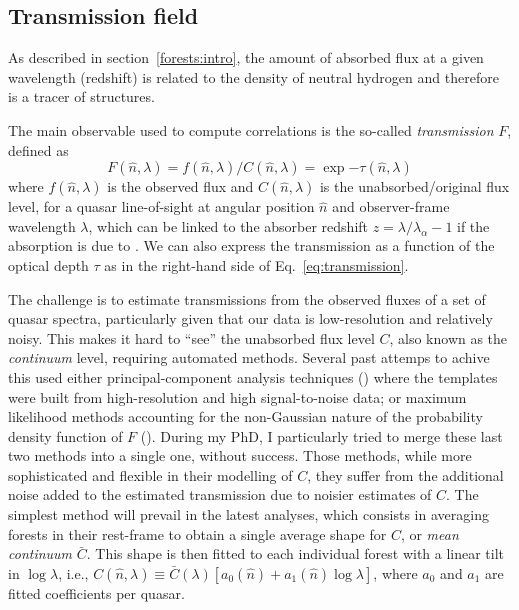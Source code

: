 \subsection{Transmission field}
\label{forests:bao:transmission}

As described in section~\ref{forests:intro}, the amount of absorbed 
flux at a given wavelength (redshift) is related to the density 
of neutral hydrogen and therefore is a tracer of structures.  

The main observable used to compute correlations is the so-called
\emph{transmission} $F$, defined as 
\begin{equation}
    F(\hat{n}, \lambda) = f(\hat{n}, \lambda)/C(\hat{n}, \lambda) = \exp{-\tau(\hat{n}, \lambda)}
    \label{eq:transmission}
\end{equation} 
where 
$f(\hat{n}, \lambda)$ is the observed flux and 
$C(\hat{n}, \lambda)$ is the unabsorbed/original flux level, 
for a quasar line-of-sight at angular position $\hat{n}$ 
and observer-frame wavelength $\lambda$, which can be linked to the
absorber redshift $z = \lambda/\lambda_\alpha - 1$ if the absorption is 
due to \lya. We can also express the transmission as a function of the 
optical depth $\tau$ as in the right-hand side of Eq.~\ref{eq:transmission}.

The challenge is to estimate transmissions from the observed fluxes of a set of quasar
spectra, particularly given that our data is low-resolution and relatively noisy.
This makes it hard to ``see'' the unabsorbed flux level $C$, also known as the 
\emph{continuum} level, requiring automated methods. Several past attemps to achive this 
used either principal-component analysis techniques 
(\cite{leeMeanfluxregulatedPrincipalComponent2012}) where the templates were built from 
high-resolution and high signal-to-noise data; or maximum likelihood methods accounting
for the non-Gaussian nature of the probability density function of $F$ 
(\cite{buscaBaryonAcousticOscillations2013}). 
During my PhD, I particularly tried to merge these 
last two methods into a single one, without success. 
Those methods, while more sophisticated and flexible in their modelling of $C$, 
they suffer from the additional noise added to the estimated transmission 
due to noisier estimates of $C$. The simplest method will prevail in the latest
analyses, which consists in averaging forests in their rest-frame to obtain a
single average shape for $C$, or \emph{mean continuum} $\bar{C}$. 
This shape is then fitted to each individual forest with a linear tilt in $\log \lambda$,
i.e., $C(\hat{n}, \lambda) \equiv \bar{C}(\lambda) [ a_0(\hat{n}) + a_1(\hat{n})\log \lambda]$,
where $a_0$ and $a_1$ are fitted coefficients per quasar. 


